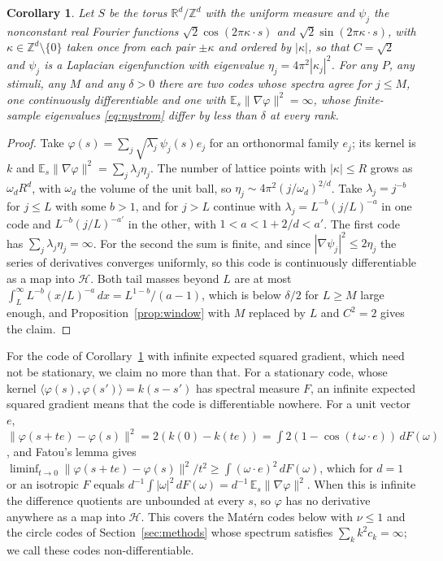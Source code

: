 \documentclass[11pt]{article}
\newtheorem{corollary}{Corollary}
\theoremstyle{definition}
\begin{document}
\begin{corollary}\label{cor:torus}
Let $S$ be the torus $\mathbb{R}^d/\mathbb{Z}^d$ with the uniform measure and $\psi_j$ the nonconstant real Fourier functions $\sqrt{2}\cos(2\pi\kappa\cdot s)$ and $\sqrt{2}\sin(2\pi\kappa\cdot s)$, with $\kappa \in \mathbb{Z}^d \setminus \{0\}$ taken once from each pair $\pm\kappa$ and ordered by $|\kappa|$, so that $C = \sqrt{2}$ and $\psi_j$ is a Laplacian eigenfunction with eigenvalue $\eta_j = 4\pi^2|\kappa_j|^2$. For any $P$, any stimuli, any $M$ and any $\delta > 0$ there are two codes whose spectra agree for $j \le M$, one continuously differentiable and one with $\mathbb{E}_s\|\nabla\varphi\|^2 = \infty$, whose finite-sample eigenvalues \eqref{eq:nystrom} differ by less than $\delta$ at every rank.
\end{corollary}

\begin{proof}
Take $\varphi(s) = \sum_j \sqrt{\lambda_j}\, \psi_j(s) e_j$ for an orthonormal family $e_j$; its kernel is $k$ and $\mathbb{E}_s \|\nabla \varphi\|^2 = \sum_j \lambda_j \eta_j$. The number of lattice points with $|\kappa| \le R$ grows as $\omega_d R^d$, with $\omega_d$ the volume of the unit ball, so $\eta_j \sim 4\pi^2 (j/\omega_d)^{2/d}$. Take $\lambda_j = j^{-b}$ for $j \le L$ with some $b > 1$, and for $j > L$ continue with $\lambda_j = L^{-b}(j/L)^{-a}$ in one code and $L^{-b}(j/L)^{-a'}$ in the other, with $1 < a < 1 + 2/d < a'$. The first code has $\sum_j \lambda_j \eta_j = \infty$. For the second the sum is finite, and since $|\nabla\psi_j|^2 \le 2\eta_j$ the series of derivatives converges uniformly, so this code is continuously differentiable as a map into $\mathcal{H}$. Both tail masses beyond $L$ are at most $\int_L^\infty L^{-b}(x/L)^{-a}\,dx = L^{1-b}/(a-1)$, which is below $\delta/2$ for $L \ge M$ large enough, and Proposition~\ref{prop:window} with $M$ replaced by $L$ and $C^2 = 2$ gives the claim.
\end{proof}

For the code of Corollary~\ref{cor:torus} with infinite expected squared gradient, which need not be stationary, we claim no more than that. For a stationary code, whose kernel $\langle \varphi(s), \varphi(s') \rangle = k(s - s')$ has spectral measure $F$, an infinite expected squared gradient means that the code is differentiable nowhere. For a unit vector $e$, $\|\varphi(s + te) - \varphi(s)\|^2 = 2(k(0) - k(te)) = \int 2(1 - \cos(t\, \omega\cdot e))\, dF(\omega)$, and Fatou's lemma gives $\liminf_{t \to 0} \|\varphi(s + te) - \varphi(s)\|^2 / t^2 \ge \int (\omega\cdot e)^2\, dF(\omega)$, which for $d = 1$ or an isotropic $F$ equals $d^{-1} \int |\omega|^2\, dF(\omega) = d^{-1}\,\mathbb{E}_s\|\nabla\varphi\|^2$. When this is infinite the difference quotients are unbounded at every $s$, so $\varphi$ has no derivative anywhere as a map into $\mathcal{H}$. This covers the Mat\'ern codes below with $\nu \le 1$ and the circle codes of Section~\ref{sec:methods} whose spectrum satisfies $\sum_k k^2 c_k = \infty$; we call these codes non-differentiable.
\end{document}

